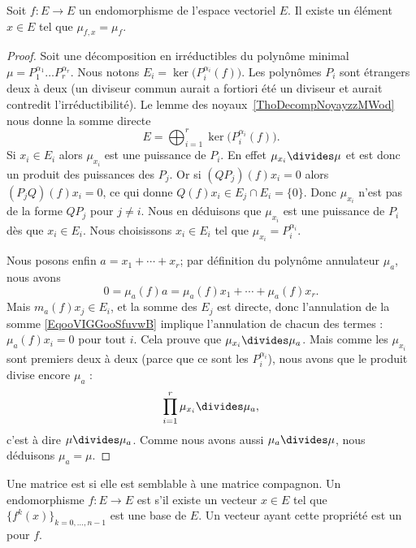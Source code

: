 \begin{lemma}\label{LemSYsJJj}
    Soit \( f\colon E\to E\) un endomorphisme de l'espace vectoriel \( E\). Il existe un élément \( x\in E\) tel que \( \mu_{f,x}=\mu_f\).
\end{lemma}

\begin{proof}
    Soit une décomposition en irréductibles du polynôme minimal \( \mu=P_1^{\alpha_1}\ldots P_r^{\alpha_r}\). Nous notons \( E_i=\ker\big( P_i^{\alpha_i}(f) \big)\). Les polynômes \( P_i\) sont étrangers deux à deux (un diviseur commun aurait a fortiori été un diviseur et aurait contredit l'irréductibilité). Le lemme des noyaux~\ref{ThoDecompNoyayzzMWod} nous donne la somme directe
    \begin{equation}
        E=\bigoplus_{i=1}^r\ker\big( P_i^{\alpha_i}(f) \big).
    \end{equation}
    Si \( x_i\in E_i\) alors \( \mu_{x_i}\) est une puissance de \( P_i\). En effet \( \mu_{x_i}\divides \mu\) et est donc un produit des puissances des \( P_j\). Or si \( (QP_j)(f)x_i=0\) alors \( (P_jQ)(f)x_i=0\), ce qui donne \( Q(f)x_i\in E_j\cap E_i=\{ 0 \}\). Donc \( \mu_{x_i}\) n'est pas de la forme \( QP_j\) pour \( j\neq i\). Nous en déduisons que \( \mu_{x_i}\) est une puissance de \( P_i\) dès que \( x_i\in E_i\). Nous choisissons \( x_i\in E_i\) tel que \( \mu_{x_i}=P_i^{\alpha_i}\).

    Nous posons enfin \( a=x_1+\cdots +x_r\); par définition du polynôme annulateur \( \mu_a\), nous avons
    \begin{equation}        \label{EqooVIGGooSfuvwB}
        0=\mu_a(f)a=\mu_a(f)x_1+\cdots +\mu_a(f)x_r.
    \end{equation}
    Mais \( m_a(f)x_j\in E_i\), et la somme des \( E_j\) est directe, donc l'annulation de la somme \eqref{EqooVIGGooSfuvwB} implique l'annulation de chacun des termes : \( \mu_a(f)x_i=0\) pour tout \( i\). Cela prouve que \( \mu_{x_i}\divides \mu_a\). Mais comme les \( \mu_{x_i}\) sont premiers deux à deux (parce que ce sont les \( P_i^{\alpha_i}\)), nous avons que le produit divise encore \( \mu_a\) :
    \begin{equation}
        \prod_{i=1}^r\mu_{x_i}\divides \mu_a,
    \end{equation}
    c'est à dire \( \mu\divides \mu_a\). Comme nous avons aussi \( \mu_a\divides \mu\), nous déduisons \( \mu_a=\mu\).
\end{proof}

\begin{definition}      \label{DEFooFEIFooNSGhQE}
    Une matrice est  si elle est semblable à une matrice compagnon. Un endomorphisme \( f\colon E\to E\) est  s'il existe un vecteur \( x\in E\) tel que \( \{ f^k(x) \}_{k=0,\ldots, n-1} \) est une base de \( E\). Un vecteur ayant cette propriété est un  pour \( f\).
\end{definition}

